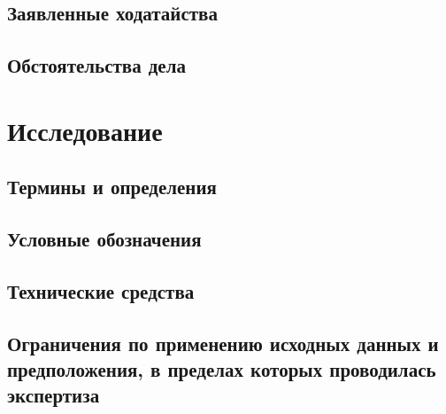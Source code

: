 \documentclass[a4paper,12pt]{article}
\begin{document}
\subsection{Заявленные ходатайства}


\subsection{Обстоятельства дела}


%

\printbibliography

\section{Исследование}


\subsection{Термины и определения}


\subsection{Условные обозначения}


\subsection{Технические средства}


\subsection{Ограничения по применению исходных данных и предположения, в пределах которых проводилась экспертиза}



%

%
%
\end{document}
